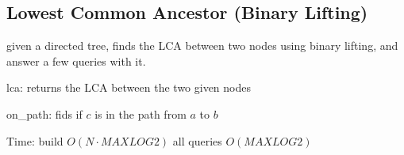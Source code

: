 \subsection{Lowest Common Ancestor (Binary Lifting)}

given a directed tree, finds the LCA between two nodes using binary lifting, and answer a few queries with it.

lca: returns the LCA between the two given nodes

on\_path: fids if $c$ is in the path from $a$ to $b$

Time: build $O(N \cdot MAXLOG2)$ all queries $O(MAXLOG2)$
